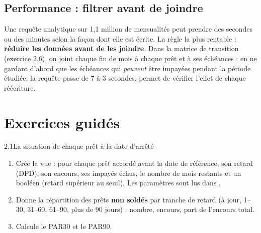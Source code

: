 \subsection{Performance : filtrer avant de joindre}

Une requête analytique sur 1,1 million de mensualités peut prendre des secondes ou des minutes selon
la façon dont elle est écrite. La règle la plus rentable : \textbf{réduire les données avant de les
joindre}. Dans la matrice de transition (exercice 2.6), on joint chaque fin de mois à chaque prêt et à
ses échéances : en ne gardant d'abord que les échéances qui \emph{peuvent} être impayées pendant la
période étudiée, la requête passe de 7 à 3 secondes.  permet de vérifier
l'effet de chaque réécriture.

\section{Exercices guidés}

\begin{exercice}{2.1}{La situation de chaque prêt à la date d'arrêté}
\begin{enumerate}[label=\alph*)]
\item Crée la vue  : pour chaque prêt accordé avant la date de référence, son
retard (DPD), son encours, ses impayés échus, le nombre de mois restants et un booléen
 (retard supérieur au seuil). Les paramètres sont lus dans .
\item Donne la répartition des prêts \textbf{non soldés} par tranche de retard (à jour, 1--30, 31--60,
61--90, plus de 90 jours) : nombre, encours, part de l'encours total.
\item Calcule le PAR30 et le PAR90.
\end{enumerate}
\end{exercice}

